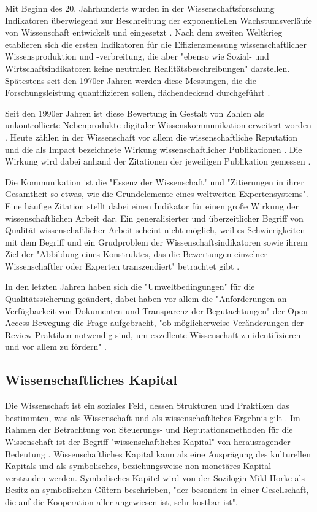 Mit Beginn des 20. Jahrhunderts wurden in der Wissenschaftsforschung Indikatoren überwiegend zur Beschreibung der exponentiellen Wachstumsverläufe von Wissenschaft entwickelt und eingesetzt \cite{Hornbostel_1997}. Nach dem zweiten Weltkrieg etablieren sich die ersten Indikatoren für die Effizienzmessung wissenschaftlicher Wissensproduktion und -verbreitung, die aber "ebenso wie Sozial- und Wirtschaftsindikatoren keine neutralen Realitätsbeschreibungen" \cite{Hornbostel_1997} darstellen. Spätestens seit den 1970er Jahren werden diese Messungen, die die Forschungsleistung quantifizieren sollen, flächendeckend durchgeführt \cite{Hornbostel_1997}.

Seit den 1990er Jahren ist diese Bewertung in Gestalt von Zahlen als unkontrollierte Nebenprodukte digitaler Wissenskommunikation erweitert worden \cite{angermueller_2010}. Heute zählen in der Wissenschaft vor allem die wissenschaftliche Reputation und die als Impact bezeichnete Wirkung wissenschaftlicher Publikationen\cite{herb_open_2013} \cite{Hornbostel_1997}. Die Wirkung wird dabei anhand der Zitationen der jeweiligen Publikation gemessen \cite{suchen}.

Die Kommunikation ist die "Essenz der Wissenschaft"\cite{bonitz_1998_matthaus} und "Zitierungen in ihrer Gesamtheit so etwas, wie die Grundelemente eines weltweiten Expertensystems"\cite{bonitz_1990_sci}. Eine häufige Zitation stellt dabei einen Indikator für einen große Wirkung der wissenschaftlichen Arbeit dar. Ein generalisierter und überzeitlicher Begriff von Qualität wissenschaftlicher Arbeit scheint nicht möglich, weil es Schwierigkeiten mit dem Begriff und ein Grudproblem der Wissenschaftsindikatoren sowie ihrem Ziel der "Abbildung eines Konstruktes, das die Bewertungen einzelner Wissenschaftler oder Experten transzendiert" betrachtet gibt \cite{Hornbostel_1997}.

In den letzten Jahren haben sich die "Umweltbedingungen" für die Qualitätssicherung geändert, dabei haben vor allem die "Anforderungen an Verfügbarkeit von Dokumenten und Transparenz der Begutachtungen" der Open Access Bewegung die Frage aufgebracht, "ob möglicherweise Veränderungen der Review-Praktiken notwendig sind, um exzellente Wissenschaft zu identifizieren und vor allem zu fördern" \cite{suchen_Hornbostel_2006}.

\subsection{Wissenschaftliches Kapital}
Die Wissenschaft ist ein soziales Feld, dessen Strukturen und Praktiken das bestimmten, was als Wissenschaft und als wissenschaftliches Ergebnis gilt \cite{mikl_2010_soziologie}. Im Rahmen der Betrachtung von Steuerungs- und Reputationsmethoden für die Wissenschaft ist der Begriff "wissenschaftliches Kapital" von herausragender Bedeutung \cite{suchen}. Wissenschaftliches Kapital kann als eine Ausprägung des kulturellen Kapitals und als symbolisches, beziehungsweise non-monetäres Kapital \cite{irmer2011} verstanden werden. Symbolisches Kapitel wird von der Sozilogin Mikl-Horke als Besitz an symbolischen Gütern beschrieben, "der besonders in einer Gesellschaft, die auf die Kooperation aller angewiesen ist, sehr kostbar ist"\cite{mikl_2010_soziologie}.

